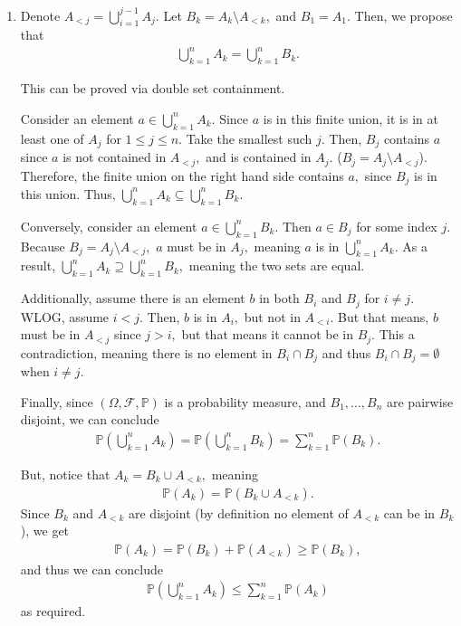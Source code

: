 \documentclass[12pt]{article}
\begin{document}
\begin{enumerate}
  \item Denote $A_{< j} = \bigcup_{i = 1}^{j -1}A_j.$
    Let $B_k = A_k \setminus A_{< k},$ and $B_1 = A_1.$ Then, we propose that
    \begin{align*}
      \bigcup_{k = 1}^{n} A_k = \bigcup_{k = 1}^{n} B_k.
    \end{align*}

    This can be proved via double set containment.

    Consider an element $a \in \bigcup_{k =1}^{n}A_k.$ Since $a$ is
    in this finite union, it is in at least one of $A_j$ for $1 \leq
    j \leq n.$ Take the smallest such $j.$ Then, $B_j$ contains $a$
    since $a$ is not contained in $A_{< j},$ and is contained in
    $A_j.$ ($B_j = A_j \setminus A_{< j}$). Therefore, the finite
    union on the right hand side contains $a,$ since $B_j$ is in this
    union. Thus, $\bigcup_{k = 1}^{n}A_k \subseteq \bigcup_{k =1}^{n} B_k.$

    Conversely, consider an element $a \in \bigcup_{k =1 }^{n} B_k.$
    Then $a \in B_j$ for some index $j.$ Because $B_j = A_j \setminus
    A_{<j},$ $a$ must be in $A_j,$ meaning $a$ is in $\bigcup_{k =
    1}^{n} A_k.$ As a result, $\bigcup_{k =1}^{n}A_k \supseteq
    \bigcup_{k = 1}^{n} B_k,$ meaning the two sets are equal.

    Additionally, assume there is an element $b$ in both $B_i$ and
    $B_j$ for $i \neq j.$ WLOG, assume $i < j.$ Then, $b$ is in
    $A_i,$ but not in $A_{< i}.$ But that means, $b$ must be in $A_{<
    j}$ since $j > i,$ but that means it cannot be in $B_j.$ This a
    contradiction, meaning there is no element in $B_i \cap B_j$ and
    thus $B_i \cap B_j = \emptyset$ when $i \neq j.$

    Finally, since $(\Omega, \mathcal F, \mathbb P)$ is a probability
    measure, and $B_1, \ldots, B_n$ are pairwise disjoint, we can conclude
    \begin{align*}
      \mathbb P\left(
        \bigcup_{k =1 }^{n} A_k
      \right) = \mathbb P\left(
        \bigcup_{k = 1}^{n} B_k
      \right) = \sum_{k = 1}^{n} \mathbb P(B_k).
    \end{align*}

    But, notice that $A_k = B_k \cup A_{< k},$ meaning
    \begin{align*}
      \mathbb P(A_k) = \mathbb P(B_k \cup A_{< k}).
    \end{align*}
    Since $B_k$ and $A_{< k}$ are disjoint (by definition no element
    of $A_{<k}$ can be in $B_k$), we get
    \begin{align*}
      \mathbb P(A_k) = \mathbb P(B_k) + \mathbb P(A_{< k}) \geq \mathbb P(B_k),
    \end{align*}
    and thus we can conclude
    \begin{align*}
      \mathbb P\left(
        \bigcup_{k =1 }^{n} A_k
      \right) \leq \sum_{k = 1}^{n} \mathbb P(A_k)
    \end{align*}
    as required.


\end{enumerate}
\end{document}
